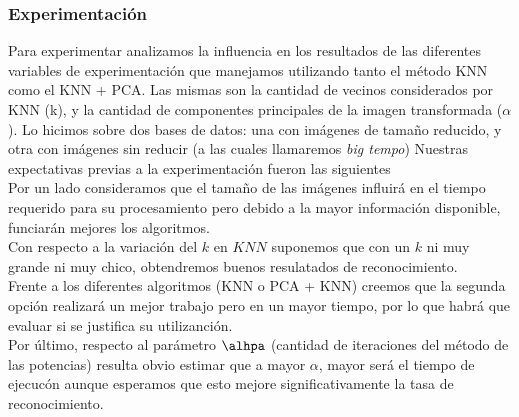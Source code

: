\subsubsection*{Experimentación}
Para experimentar analizamos la influencia en los resultados de las diferentes variables de experimentación que manejamos utilizando tanto el método KNN como el KNN + PCA. 
Las mismas son la cantidad de vecinos considerados por KNN (k), y la cantidad de componentes principales de la imagen transformada ($\alpha$).
Lo hicimos sobre dos bases de datos: una con im\'agenes de tamaño reducido, y otra con imágenes sin reducir (a las cuales llamaremos \textit{big tempo})
Nuestras expectativas previas a la experimentación fueron las siguientes\\
Por un lado consideramos que el tamaño de las im\'agenes influir\'a en el tiempo requerido para su procesamiento pero debido a la mayor informaci\'on disponible,
funciar\'an mejores los algoritmos.\\
Con respecto a la variaci\'on del $k$ en $KNN$ suponemos que con un $k$ ni muy grande ni muy chico, obtendremos buenos resulatados de reconocimiento.\\
Frente a los diferentes algoritmos (KNN o PCA + KNN) creemos que la segunda opci\'on realizar\'a un mejor trabajo pero en un mayor tiempo, por lo que habr\'a que evaluar si se justifica su utilizanci\'on.\\
Por \'ultimo, respecto al par\'ametro $\alhpa$ (cantidad de iteraciones del m\'etodo de las potencias) resulta obvio estimar que a mayor $\alpha$, mayor ser\'a el tiempo de ejecuc\'on aunque esperamos que esto
mejore significativamente la tasa de reconocimiento.





